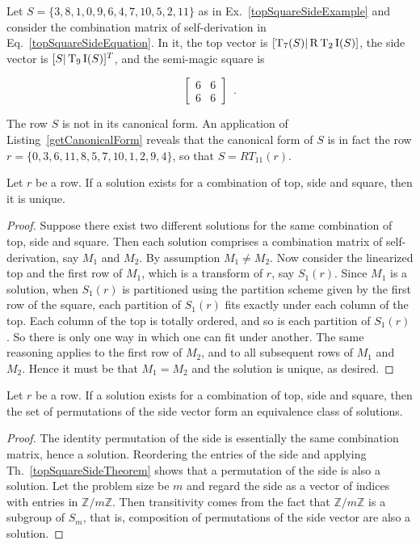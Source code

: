\begin{example}
Let $S = \{ 3, 8, 1, 0, 9, 6, 4, 7, 10, 5, 2, 11 \}$ as in Ex.~\ref{topSquareSideExample} and consider the combination matrix of self-derivation in Eq.~\ref{topSquareSideEquation}. In it, the top vector is $[\operatorname{T}_7(S) | \operatorname{R}\operatorname{T}_2\operatorname{I}(S)]$, the side vector is $[S | \operatorname{T}_9\operatorname{I}(S)]^T$, and the semi-magic square is

	\begin{equation}
        \left[
        \begin{array}{c|c}
            6 & 6 \\
            \hline
            6 & 6
        \end{array}
        \right] \enspace.
    \end{equation}
    
The row $S$ is not in its canonical form. An application of Listing~\ref{getCanonicalForm} reveals that the canonical form of $S$ is in fact the row $r = \{0, 3, 6, 11, 8, 5, 7, 10, 1, 2, 9, 4\}$, so that $S = RT_{11}(r)$.
\end{example}

\begin{theorem}
	\label{topSquareSideTheorem}
	Let $r$ be a row. If a  solution exists for a combination of top, side and square, then it is unique.
	\begin{proof}
	Suppose there exist two different solutions for the same combination of top, side and square. Then each solution comprises a combination matrix of self-derivation, say $M_1$ and $M_2$. By assumption $M_1 \ne M_2$. Now consider the linearized top and the first row of $M_1$, which is a transform of $r$, say $S_1(r)$. Since $M_1$ is a solution, when $S_1(r)$ is partitioned using the partition scheme given by the first row of the square, each partition of $S_1(r)$ fits exactly under each column of the top. Each column of the top is totally ordered, and so is each partition of $S_1(r)$. So there is only one way in which one can fit under another. The same reasoning applies to the first row of $M_2$, and to all subsequent rows of $M_1$ and $M_2$. Hence it must be that $M_1 = M_2$ and the solution is unique, as desired.
	\end{proof}
\end{theorem}

\begin{corollary}
	\label{topSquareSideCorollary}
	Let $r$ be a row. If a  solution exists for a combination of top, side and square, then the set of permutations of the side vector form an equivalence class of solutions.
	\begin{proof}
		The identity permutation of the side is essentially the same combination matrix, hence a solution. Reordering the entries of the side and applying Th.~\ref{topSquareSideTheorem} shows that a permutation of the side is also a solution. Let the problem size be $m$ and regard the side as a vector of indices with entries in $\mathbb{Z} / m \mathbb{Z}$. Then transitivity comes from the fact that $\mathbb{Z} / m \mathbb{Z}$ is a subgroup of $S_m$, that is, composition of permutations of the side vector are also a solution.
	\end{proof}
\end{corollary}


